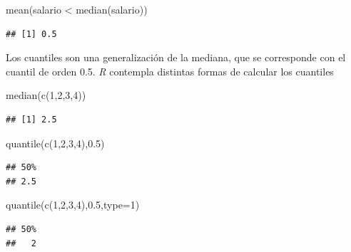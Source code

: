 \documentclass[
]{book}
\newenvironment{Shaded}{\begin{snugshade}}{\end{snugshade}}
\newcommand{\AttributeTok}[1]{\textcolor[rgb]{0.77,0.63,0.00}{#1}}
\newcommand{\DecValTok}[1]{\textcolor[rgb]{0.00,0.00,0.81}{#1}}
\newcommand{\FloatTok}[1]{\textcolor[rgb]{0.00,0.00,0.81}{#1}}
\newcommand{\FunctionTok}[1]{\textcolor[rgb]{0.00,0.00,0.00}{#1}}
\newcommand{\NormalTok}[1]{#1}
\newcommand{\SpecialCharTok}[1]{\textcolor[rgb]{0.00,0.00,0.00}{#1}}
\theoremstyle{break}
\theoremstyle{nonumberplain}
\begin{document}
\begin{Shaded}
\begin{Highlighting}[]
\FunctionTok{mean}\NormalTok{(salario }\SpecialCharTok{\textless{}} \FunctionTok{median}\NormalTok{(salario))}
\end{Highlighting}
\end{Shaded}

\begin{verbatim}
## [1] 0.5
\end{verbatim}

Los cuantiles son una generalización de la mediana, que se corresponde con el
cuantil de orden 0.5. \emph{R} contempla distintas formas
de calcular los cuantiles

\begin{Shaded}
\begin{Highlighting}[]
\FunctionTok{median}\NormalTok{(}\FunctionTok{c}\NormalTok{(}\DecValTok{1}\NormalTok{,}\DecValTok{2}\NormalTok{,}\DecValTok{3}\NormalTok{,}\DecValTok{4}\NormalTok{))}
\end{Highlighting}
\end{Shaded}

\begin{verbatim}
## [1] 2.5
\end{verbatim}

\begin{Shaded}
\begin{Highlighting}[]
\FunctionTok{quantile}\NormalTok{(}\FunctionTok{c}\NormalTok{(}\DecValTok{1}\NormalTok{,}\DecValTok{2}\NormalTok{,}\DecValTok{3}\NormalTok{,}\DecValTok{4}\NormalTok{),}\FloatTok{0.5}\NormalTok{)}
\end{Highlighting}
\end{Shaded}

\begin{verbatim}
## 50% 
## 2.5
\end{verbatim}

\begin{Shaded}
\begin{Highlighting}[]
\FunctionTok{quantile}\NormalTok{(}\FunctionTok{c}\NormalTok{(}\DecValTok{1}\NormalTok{,}\DecValTok{2}\NormalTok{,}\DecValTok{3}\NormalTok{,}\DecValTok{4}\NormalTok{),}\FloatTok{0.5}\NormalTok{,}\AttributeTok{type=}\DecValTok{1}\NormalTok{)}
\end{Highlighting}
\end{Shaded}

\begin{verbatim}
## 50% 
##   2
\end{verbatim}
\end{document}
